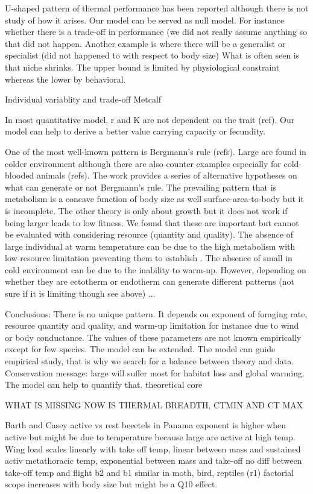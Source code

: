  U-shaped pattern of thermal performance has been reported although there is not study of how it arises.
 Our model can be served as null model.
 For instance whether there is a trade-off in performance (we did not really assume anything so that did not happen.
 Another example is where there will be a generalist or specialist (did not happened to with respect to body size)
 What is often seen is that niche shrinks.
 The upper bound is limited by physiological  constraint whereas the lower by behavioral.
 
 Individual variablity and trade-off Metcalf
  
 In most quantitative model, r and K are not dependent on the trait (ref).
 Our model can help to derive a better value carrying capacity or fecundity.
 

One of the most well-known pattern is Bergmann's rule (refs).
Large are found in colder environment although there are also counter examples especially for cold-blooded animals (refs).
The work provides a series of alternative hypotheses on what can generate or not Bergmann's rule.
The prevailing pattern that is metabolism is a concave function of body size as well surface-area-to-body but it is incomplete.
The other theory is only about growth but it does not work if being larger leads to low fitness.
We found that these are important but cannot be evaluated with considering resource (quantity and quality).
The absence of large individual at warm temperature can be due to the high metabolism with low resource limitation preventing them to establish \citep{Angert2005}. 
The absence of small in cold environment can be due to the inability to warm-up.
However, depending on whether they are ectotherm or endotherm can generate different patterns (not sure if it is limiting though see above)
...

Conclusions:
There is no unique pattern.
It depends on exponent of foraging rate, resource quantity and quality, and warm-up limitation for instance due to wind or body conductance.
The values of these parameters  are not known empirically except for few species.
The model can be extended.
The model can guide empirical study, that is why we search for a balance between theory and data.
Conservation message: large will suffer most for habitat loss and global warming.
The model can help to quantify that. 
theoretical core
 

WHAT IS MISSING NOW IS THERMAL BREADTH, CTMIN AND CT MAX


Barth and Casey active vs rest beeetels in Panama
exponent is higher when active but might be due to temperature because large are active at high temp.
Wing load scales linearly with take off temp,  linear between mass and sustained activ metathoracic temp, exponential between mass and  take-off
no diff between take-off temp and flight  
b2 and b1 similar in moth, bird, reptiles (r1)
factorial scope increases with body size but might be a Q10 effect.

